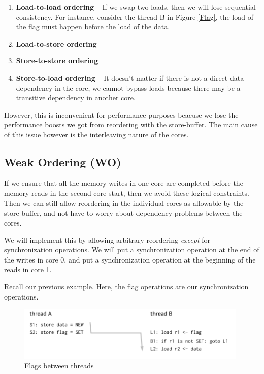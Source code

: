 \documentclass{article}
\begin{document}
\begin{enumerate}

\item \textbf{Load-to-load ordering} -- If we swap two loads, then we will lose sequential consistency. For instance, consider the thread B in Figure \ref{Flag}, the load of the flag must happen before the load of the data. 

\item \textbf{Load-to-store ordering} 

\item \textbf{Store-to-store ordering} 

\item \textbf{Store-to-load ordering} -- It doesn't matter if there is not a direct data dependency in the core, we cannot bypass loads because there may be a transitive dependency in another core.
\end{enumerate}

However, this is inconvenient for performance purposes beacuse we lose the performance boosts we got from reordering with the store-buffer. The main cause of this issue however is the interleaving nature  of the cores. 

\subsection{Weak Ordering (WO)}

If we ensure that all the memory writes in one core are completed before the memory reads in the second core start, then we avoid these logical constraints. Then we can still allow reordering in the individual cores as allowable by the store-buffer, and not have to worry about dependency problems between the cores.


We will implement this by allowing arbitrary reordering \textit{except} for synchronization operations. We will put a synchronization operation at the end of the writes in core 0, and put a synchronization operation at the beginning of the reads in core 1. 

Recall our previous example. Here, the flag operations are our synchronization operations.

\begin{figure}[ht!]
\centering
\includegraphics[width=110mm]{img/flags.png}
\caption{Flags between threads}
\label{Flag2}
\end{figure}
\end{document}
